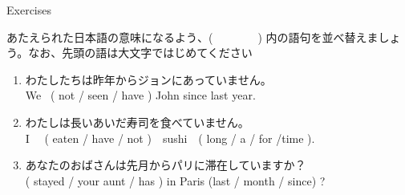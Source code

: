 \documentclass[aspectratio=169,xcolor={dvipsnames,table}]{beamer}
\newcommand{\myaudio}[1]{\href{#1}{\faVolumeUp}}
\begin{document}
\begin{frame}[plain]{Exercises}
 
あたえられた日本語の意味になるよう、(~~~~~~~~) 内の語句を並べ替えましょう。なお、先頭の語は大文字ではじめてください\mbox{}\hfill\myaudio{./audio/012_have_pp_keizoku_09.mp3}


\begin{enumerate}
 \item {\small わたしたちは昨年からジョンにあっていません。}\\
We  ~( not / seen / have ) John since last year.\\
 \item  {\small わたしは長いあいだ寿司を食べていません。\\
I ~~( eaten /  have / not )~~sushi~~( }long / a / for /time ).\\
 \item  {\small あなたのおばさんは先月からパリに滞在していますか}？\bcdfrance\\
( stayed /  your aunt / has ) in Paris (last / month / since) ? \\
\end{enumerate}
\end{frame}
\end{document}
